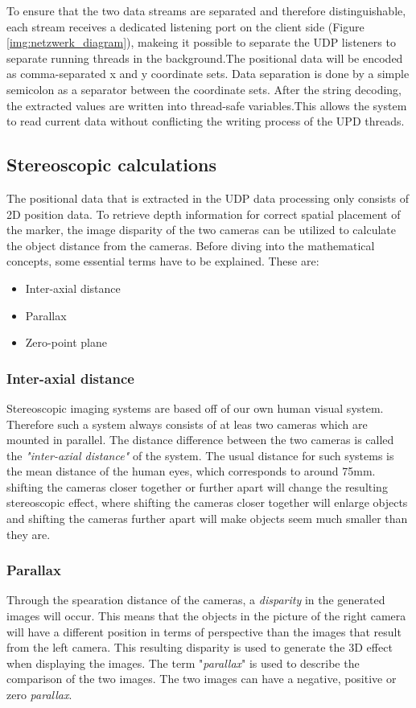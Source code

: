 To ensure that the two data streams are separated and therefore distinguishable, each stream receives a dedicated listening port on the client side (Figure \ref{img:netzwerk_diagram}), makeing it possible to separate the UDP listeners to separate running threads in the background.The positional data will be encoded as comma-separated x and y coordinate sets. Data separation is done by a simple semicolon as a separator between the coordinate sets. After the string decoding, the extracted values are written into thread-safe variables.This allows the system to read current data without conflicting the writing process of the UPD threads.
\subsection{Stereoscopic calculations}
The positional data that is extracted in the UDP data processing only consists of 2D position data. To retrieve depth information for correct spatial placement of the marker, the image disparity of the two cameras can be utilized to calculate the object distance from the cameras.\cite{Tauer.2010}\newpage
Before diving into the mathematical concepts, some essential terms have to be explained.
These are:
\begin{itemize}
\item Inter-axial distance
\item Parallax
\item Zero-point plane
\end{itemize}
\subsubsection{Inter-axial distance}
Stereoscopic imaging systems are based off of our own human visual system. Therefore such a system always consists of at leas two cameras which are mounted in parallel. The distance difference between the two cameras is called the \textit{"inter-axial distance"} of the system. The usual distance for such systems is the mean distance of the human eyes, which corresponds to around 75mm. shifting the cameras closer together or further apart will change the resulting stereoscopic effect, where shifting the cameras closer together will enlarge objects and shifting the cameras further apart will make objects seem much smaller than they are. 
\subsubsection{Parallax}
Through the spearation distance of the cameras, a \textit{disparity} in the generated images will occur. This means that the objects in the picture of the right camera will have a different position in terms of perspective than the images that result from the left camera. This resulting disparity is used to generate the 3D effect when displaying the images. The term "\textit{parallax}" is used to describe the comparison of the two images. The two images can have a negative, positive or zero \textit{parallax}.
